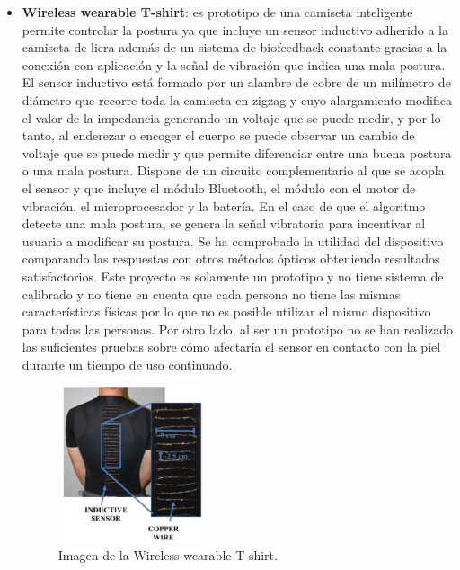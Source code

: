\begin{itemize}
    \item \textbf{Wireless wearable T-shirt}\cite{wirelessT-shirt}: es prototipo de una camiseta inteligente permite controlar la postura ya que incluye un sensor inductivo adherido a la camiseta de licra además de un sistema de biofeedback constante gracias a la conexión con aplicación y la señal de vibración que indica una mala postura. El sensor inductivo está formado por un alambre de cobre de un milímetro de diámetro que recorre toda la camiseta en zigzag y cuyo alargamiento modifica el valor de la impedancia generando un voltaje que se puede medir, y por lo tanto, al enderezar o encoger el cuerpo se puede observar un cambio de voltaje que se puede medir y que permite diferenciar entre una buena postura o una mala postura. Dispone de un circuito complementario al que se acopla el sensor y que incluye el módulo Bluetooth, el módulo con el motor de vibración, el microprocesador y la batería. En el caso de que el algoritmo detecte una mala postura, se genera la señal vibratoria para incentivar al usuario a modificar su postura. Se ha comprobado la utilidad del dispositivo comparando las respuestas con otros métodos ópticos obteniendo resultados satisfactorios. Este proyecto es solamente un prototipo y no tiene sistema de calibrado y no tiene en cuenta que cada persona no tiene las mismas características físicas por lo que no es posible utilizar el mismo dispositivo para todas las personas. Por otro lado, al ser un prototipo no se han realizado las suficientes pruebas sobre cómo afectaría el sensor en contacto con la piel durante un tiempo de uso continuado.
\begin{figure}[h!]
    \centering
    \includegraphics[width=0.4\textwidth]{img/imgWeaTshirt.jpg}
    \caption{Imagen de la Wireless wearable T-shirt.\cite{wirelessT-shirt}}
    \label{fig:imgWeaTshirt} 
\end{figure}


\end{itemize}
